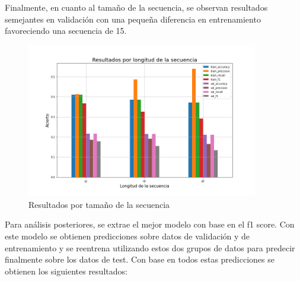 Finalmente, en cuanto al tamaño de la secuencia, se observan resultados semejantes en validación con una pequeña diferencia en entrenamiento favoreciendo una secuencia de 15.\\

\begin{figure}[H]
    \centering
    \includegraphics[width=0.9\textwidth]{results/friends/deepModels/sim_res_deep_seq_len.png}
    \caption{Resultados por tamaño de la secuencia}
    \label{fig:fri_deep_seq_len}
\end{figure}

Para análisis posteriores, se extrae el mejor modelo con base en el f1 score. Con este modelo se obtienen predicciones sobre datos de validación y de entrenamiento y se reentrena utilizando estos dos grupos de datos para predecir finalmente sobre los datos de test. Con base en todos estas predicciones se obtienen los siguientes resultados:

